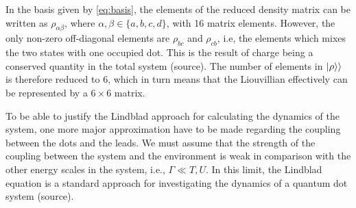 \documentclass[../main.tex]{subfiles}
\begin{document}
In the basis given by \cref{eq:basis}, the elements of the reduced density matrix can be written as $\rho_{\alpha\beta}$, where $\alpha,\beta\in\{a,b,c,d\}$, with 16 matrix elements. However, the only non-zero off-diagonal elements are $\rho_{bc}$ and $\rho_{cb}$, i.e, the elements which mixes the two states with one occupied dot. This is the result of charge being a conserved quantity in the total system (source). The number of elements in $\ket{\rho}\rangle$ is therefore reduced to 6, which in turn means that the Liouvillian effectively can be represented by a $6\times6$ matrix.

To be able to justify the Lindblad approach for calculating the dynamics of the system, one more major approximation have to be made regarding the coupling between the dots and the leads. We must assume that the strength of the coupling between the system and the environment is weak in comparison with the other energy scales in the system, i.e., $\Gamma \ll T, U$. In this limit, the Lindblad equation is a standard approach for investigating the dynamics of a quantum dot system (source).

\end{document}
